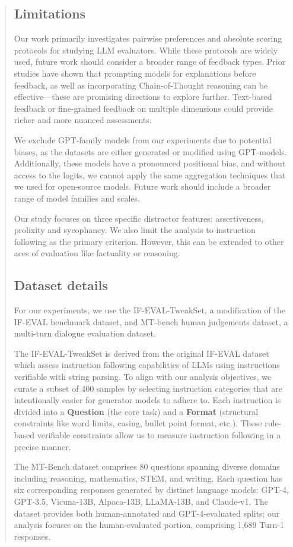 \documentclass{article}
\begin{document}
\begin{abstract}
\subsection{Limitations}
Our work primarily investigates pairwise preferences and absolute scoring protocols for studying LLM evaluators. While these protocols are widely used, future work should consider a broader range of feedback types. Prior studies have shown that prompting models for explanations before feedback, as well as incorporating Chain-of-Thought reasoning can be effective---these are promising directions to explore further. Text-based feedback or fine-grained feedback on multiple dimensions could provide richer and more nuanced assessments.

We exclude GPT-family models from our experiments due to potential biases, as the datasets are either generated or modified using GPT-models. Additionally, these models have a pronounced positional bias, and without access to the logits, we cannot apply the same aggregation techniques that we used for open-source models. Future work should include a broader range of model families and scales. 

Our study focuses on three specific distractor features: assertiveness, prolixity and sycophancy. We also limit the analysis to instruction following as the primary criterion. However, this can be extended to other aces of evaluation like factuality or reasoning. 

\subsection{Dataset details}
For our experiments, we use the IF-EVAL-TweakSet, a modification of the IF-EVAL benchmark dataset, and MT-bench human judgements dataset, a multi-turn dialogue evaluation dataset. 

The IF-EVAL-TweakSet is derived from the original IF-EVAL dataset which assess instruction following capabilities of LLMs using instructions verifiable with string parsing. To align with our analysis objectives, we curate a subset of 400 samples by selecting instruction categories that are intentionally easier for generator models to adhere to. Each instruction is divided into a \textbf{Question} (the core task) and a \textbf{Format} (structural constraints like word limits, casing, bullet point format, etc.). These rule-based verifiable constraints allow us to measure instruction following in a precise manner.

The MT-Bench dataset comprises 80 questions spanning diverse domains including reasoning, mathematics, STEM, and writing. Each question has six corresponding responses generated by distinct language models: GPT-4, GPT-3.5, Vicuna-13B, Alpaca-13B, LLaMA-13B, and Claude-v1. The dataset provides both human-annotated and GPT-4-evaluated splits; our analysis focuses on the human-evaluated portion, comprising 1,689 Turn-1 responses.


\end{abstract}
\end{document}
